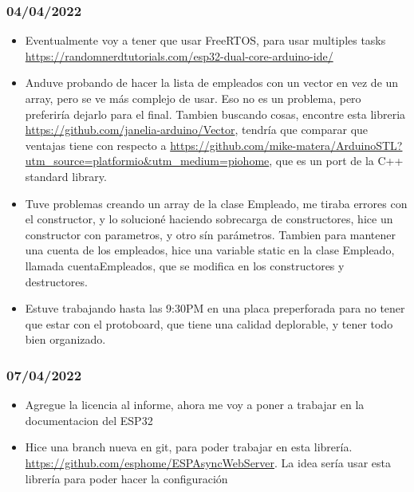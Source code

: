 \documentclass[../informe_krapp.tex]{subfiles}
\begin{document}
\subsubsection*{04/04/2022}
\begin{itemize}
	\item Eventualmente voy a tener que usar FreeRTOS, para usar multiples tasks
	      \url{https://randomnerdtutorials.com/esp32-dual-core-arduino-ide/}
	\item Anduve probando de hacer la lista de empleados con un vector en vez
	      de un array, pero se ve más complejo de usar. Eso no es un problema, pero preferiría
	      dejarlo para el final. Tambien buscando cosas, encontre esta libreria
	      \url{https://github.com/janelia-arduino/Vector}, tendría que comparar que ventajas
	      tiene con respecto a
	      \url{https://github.com/mike-matera/ArduinoSTL?utm_source=platformio&utm_medium=piohome},
	      que es un port de la C++ standard library.
	\item Tuve problemas creando un array de la clase Empleado, me tiraba errores
	      con el constructor, y lo solucioné haciendo sobrecarga de constructores, hice
	      un constructor con parametros, y otro sín parámetros.
	      Tambien para mantener una cuenta de los empleados, hice una variable static
	      en la clase Empleado, llamada cuentaEmpleados, que se modifica en los constructores
	      y destructores.
	\item Estuve trabajando hasta las 9:30PM en una placa preperforada
	      para no tener que estar con el protoboard, que tiene una calidad deplorable,
	      y tener todo bien organizado. 
\end{itemize}

\subsubsection*{07/04/2022}
\begin{itemize}
	\item Agregue la licencia al informe, ahora me voy a poner a trabajar en la documentacion
	      del ESP32
	\item Hice una branch nueva en git, para poder trabajar en esta librería.
	      \url{https://github.com/esphome/ESPAsyncWebServer}. La idea sería usar esta
	      librería para poder hacer la configuración
\end{itemize}
\end{document}
